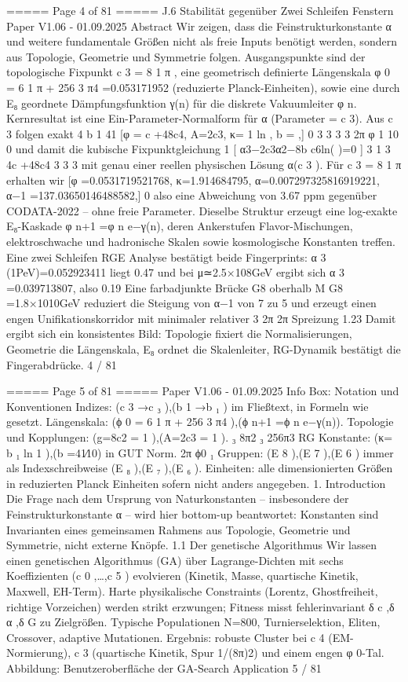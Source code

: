 \begin{MyVerbatim}
===== Page 4 of 81 =====
J.6 Stabilität gegenüber Zwei Schleifen Fenstern
Paper V1.06 - 01.09.2025
Abstract
Wir zeigen, dass die Feinstrukturkonstante α und weitere fundamentale Größen nicht als freie Inputs benötigt werden,
sondern aus Topologie, Geometrie und Symmetrie folgen. Ausgangspunkte sind
der topologische Fixpunkt c 3 = 8 1 π ,
eine geometrisch definierte Längenskala φ 0 = 6 1 π + 256 3 π4 =0.053171952 (reduzierte Planck-Einheiten),
sowie eine durch E₈ geordnete Dämpfungsfunktion γ(n) für die diskrete Vakuumleiter φ n.
Kernresultat ist eine Ein-Parameter-Normalform für α (Parameter = c 3). Aus c 3 folgen exakt
4 b 1 41
[φ = c +48c4, A=2c3, κ= 1 ln , b = ,]
0 3 3 3 3 2π φ 1 10
0
und damit die kubische Fixpunktgleichung
1
[ α3−2c3α2−8b c6ln( )=0 ]
3 1 3 4c +48c4
3 3 3
mit genau einer reellen physischen Lösung α(c 3 ). Für c 3 = 8 1 π erhalten wir
[φ =0.0531719521768, κ=1.914684795, α=0.007297325816919221, α−1 =137.03650146488582,]
0
also eine Abweichung von 3.67 ppm gegenüber CODATA-2022 – ohne freie Parameter.
Dieselbe Struktur erzeugt eine log-exakte E₈-Kaskade φ n+1 =φ n e−γ(n), deren Ankerstufen Flavor-Mischungen,
elektroschwache und hadronische Skalen sowie kosmologische Konstanten treffen.
Eine zwei Schleifen RGE Analyse bestätigt beide Fingerprints:
α 3 (1PeV)=0.052923411 liegt 0.47%
und bei μ≃2.5×108GeV ergibt sich α 3 =0.039713807, also 0.19%
Eine farbadjunkte Brücke G8 oberhalb M G8 =1.8×1010GeV
reduziert die Steigung von α−1 von 7 zu 5 und erzeugt einen engen Unifikationskorridor mit minimaler relativer
3 2π 2π
Spreizung 1.23%
Damit ergibt sich ein konsistentes Bild:
Topologie fixiert die Normalisierungen, Geometrie die Längenskala, E₈ ordnet die Skalenleiter, RG-Dynamik bestätigt
die Fingerabdrücke.
4 / 81

===== Page 5 of 81 =====
Paper V1.06 - 01.09.2025
Info Box: Notation und Konventionen
Indizes: (c 3 →c ₃ ),(b 1 →b ₁ ) im Fließtext, in Formeln wie gesetzt.
Längenskala: (ϕ 0 = 6 1 π + 256 3 π4 ),(ϕ n+1 =ϕ n e−γ(n)).
Topologie und Kopplungen: (g=8c2 = 1 ),(A=2c3 = 1 ).
₃ 8π2 ₃ 256π3
RG Konstante: (κ= b ₁ ln 1 ),(b =41∕10) in GUT Norm.
2π ϕ0 ₁
Gruppen: (E 8 ),(E 7 ),(E 6 ) immer als Indexschreibweise (E ₈ ),(E ₇ ),(E ₆ ).
Einheiten: alle dimensionierten Größen in reduzierten Planck Einheiten sofern nicht anders angegeben.
1. Introduction
Die Frage nach dem Ursprung von Naturkonstanten – insbesondere der Feinstrukturkonstante α – wird hier bottom-up
beantwortet: Konstanten sind Invarianten eines gemeinsamen Rahmens aus Topologie, Geometrie und Symmetrie,
nicht externe Knöpfe.
1.1 Der genetische Algorithmus
Wir lassen einen genetischen Algorithmus (GA) über Lagrange-Dichten mit sechs Koeffizienten (c 0 ,…,c 5 ) evolvieren
(Kinetik, Masse, quartische Kinetik, Maxwell, EH-Term). Harte physikalische Constraints (Lorentz, Ghostfreiheit, richtige
Vorzeichen) werden strikt erzwungen; Fitness misst fehlerinvariant δ c ,δ α ,δ G zu Zielgrößen. Typische Populationen
N=800, Turnierselektion, Eliten, Crossover, adaptive Mutationen. Ergebnis: robuste Cluster bei c 4 (EM-Normierung), c 3
(quartische Kinetik, Spur 1/(8π)2) und einem engen φ 0-Tal.
Abbildung: Benutzeroberfläche der GA-Search Application
5 / 81


\end{MyVerbatim}
